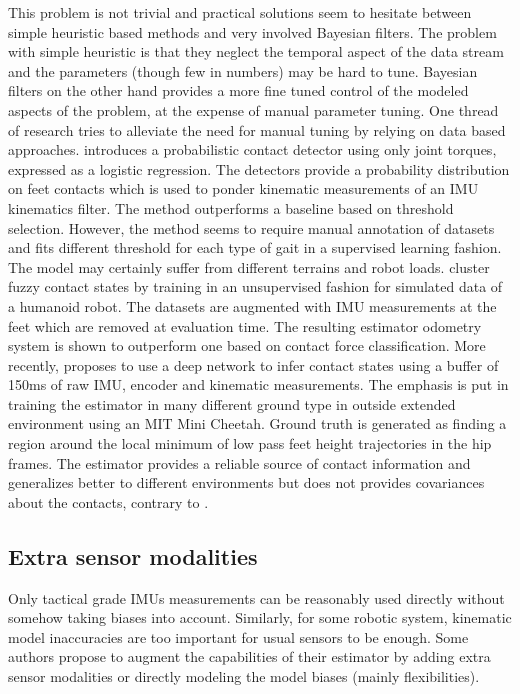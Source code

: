 This problem is not trivial and practical solutions seem to hesitate between simple heuristic based methods and very involved Bayesian filters. 
The problem with simple heuristic is that they neglect the temporal aspect of the data stream and the parameters (though few in numbers) may be hard to tune.
Bayesian filters on the other hand provides a more fine tuned control of the modeled aspects of the problem, at the expense of manual parameter tuning.
One thread of research tries to alleviate the need for manual tuning by relying on data based approaches. \cite{camurri2017probabilistic} introduces a probabilistic 
contact detector using only joint torques, expressed as a logistic regression. The detectors provide a probability distribution on feet contacts which is used to ponder kinematic
measurements of an IMU kinematics filter. The method outperforms a baseline based on threshold selection. However, the method seems to require manual annotation of datasets and 
fits different threshold for each type of gait in a supervised learning fashion. The model may certainly suffer from different terrains and robot loads. 
\cite{rotella2018unsupervised} cluster fuzzy contact states by training in an unsupervised fashion for simulated data of a humanoid robot. The datasets are augmented
with IMU measurements at the feet which are removed at evaluation time. The resulting estimator odometry system is shown to outperform one based on contact force classification.
More recently, \cite{lin2021deep} proposes to use a deep network to infer contact states using a buffer of 150ms of raw IMU, encoder and kinematic measurements. 
The emphasis is put in training the estimator in many different ground type in outside extended environment using an MIT Mini Cheetah. Ground truth is generated
as finding a region around the local minimum of low pass feet height trajectories in the hip frames. The estimator provides a reliable source of contact information 
and generalizes better to different environments but does not provides covariances about the contacts, contrary to \cite{camurri2017probabilistic}.  


\subsection{Extra sensor modalities}
Only tactical grade IMUs measurements can be reasonably used directly without somehow taking biases into account.
Similarly, for some robotic system, kinematic model inaccuracies are too important for usual sensors to be enough. Some authors propose to 
augment the capabilities of their estimator by adding extra sensor modalities or directly modeling the model biases (mainly flexibilities).


